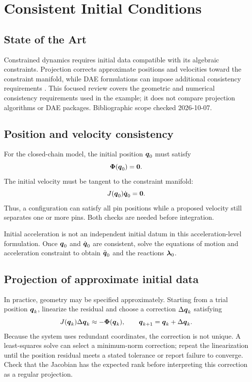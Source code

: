 \documentclass[../main.tex]{subfiles}
\begin{document}
\chapter{Consistent Initial Conditions}
\label{chap:initial-conditions}

\section{State of the Art}
Constrained dynamics requires initial data compatible with its algebraic constraints. Projection corrects approximate positions and velocities toward the constraint manifold, while DAE formulations can impose additional consistency requirements \cite{shabana2013dynamics,ascherpetzold1998}. This focused review covers the geometric and numerical consistency requirements used in the example; it does not compare projection algorithms or DAE packages. Bibliographic scope checked 2026-10-07.

\section{Position and velocity consistency}

For the closed-chain model, the initial position $\boldsymbol{q}_0$ must satisfy
\begin{equation}
	\boldsymbol{\Phi}(\boldsymbol{q}_0)=\boldsymbol{0}.
	\label{eq:initial-position-consistency}
\end{equation}
The initial velocity must be tangent to the constraint manifold:
\begin{equation}
	J(\boldsymbol{q}_0)\dot{\boldsymbol{q}}_0=\boldsymbol{0}.
	\label{eq:initial-velocity-consistency}
\end{equation}
Thus, a configuration can satisfy all pin positions while a proposed velocity still separates one or more pins. Both checks are needed before integration.

Initial acceleration is not an independent initial datum in this acceleration-level formulation. Once $\boldsymbol{q}_0$ and $\dot{\boldsymbol{q}}_0$ are consistent, solve the equations of motion and acceleration constraint to obtain $\ddot{\boldsymbol{q}}_0$ and the reactions $\boldsymbol{\lambda}_0$.

\section{Projection of approximate initial data}

In practice, geometry may be specified approximately. Starting from a trial position $\boldsymbol{q}_k$, linearize the residual and choose a correction $\Delta\boldsymbol{q}_k$ satisfying
\begin{equation}
	J(\boldsymbol{q}_k)\Delta\boldsymbol{q}_k
	\approx -\boldsymbol{\Phi}(\boldsymbol{q}_k),
	\qquad
	\boldsymbol{q}_{k+1}=\boldsymbol{q}_k+\Delta\boldsymbol{q}_k.
	\label{eq:position-projection-step}
\end{equation}
Because the system uses redundant coordinates, the correction is not unique. A least-squares solve can select a minimum-norm correction; repeat the linearization until the position residual meets a stated tolerance or report failure to converge. Check that the Jacobian has the expected rank before interpreting this correction as a regular projection.
\end{document}
